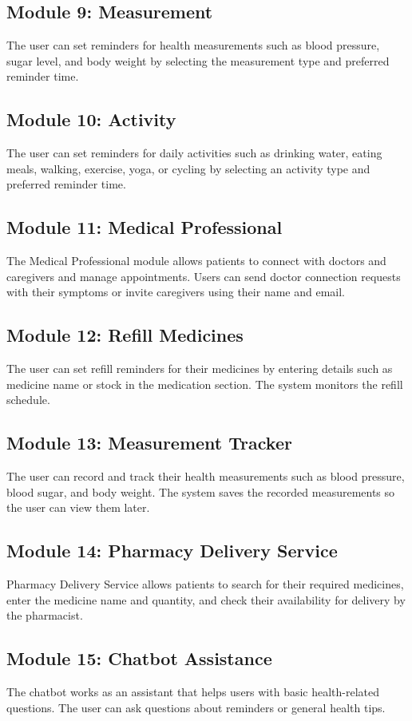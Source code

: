 \documentclass[12pt, a4paper, oneside]{report}
\begin{document}
\subsection{Module 9: Measurement}
The user can set reminders for health measurements such as blood pressure, sugar level, and body weight by selecting the measurement type and preferred reminder time.

\subsection{Module 10: Activity}
The user can set reminders for daily activities such as drinking water, eating meals, walking, exercise, yoga, or cycling by selecting an activity type and preferred reminder time.

\subsection{Module 11: Medical Professional}
The Medical Professional module allows patients to connect with doctors and caregivers and manage appointments. Users can send doctor connection requests with their symptoms or invite caregivers using their name and email.

\subsection{Module 12: Refill Medicines}
The user can set refill reminders for their medicines by entering details such as medicine name or stock in the medication section. The system monitors the refill schedule.

\subsection{Module 13: Measurement Tracker}
The user can record and track their health measurements such as blood pressure, blood sugar, and body weight. The system saves the recorded measurements so the user can view them later.

\subsection{Module 14: Pharmacy Delivery Service}
Pharmacy Delivery Service allows patients to search for their required medicines, enter the medicine name and quantity, and check their availability for delivery by the pharmacist.

\subsection{Module 15: Chatbot Assistance}
The chatbot works as an assistant that helps users with basic health-related questions. The user can ask questions about reminders or general health tips.
\end{document}
